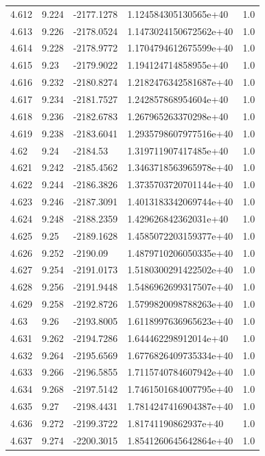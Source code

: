\begin{tabular}{lllll}
4.612 & 9.224 & -2177.1278 & 1.124584305130565e+40 & 1.0 \\
4.613 & 9.226 & -2178.0524 & 1.1473024150672562e+40 & 1.0 \\
4.614 & 9.228 & -2178.9772 & 1.1704794612675599e+40 & 1.0 \\
4.615 & 9.23 & -2179.9022 & 1.194124714858955e+40 & 1.0 \\
4.616 & 9.232 & -2180.8274 & 1.2182476342581687e+40 & 1.0 \\
4.617 & 9.234 & -2181.7527 & 1.242857868954604e+40 & 1.0 \\
4.618 & 9.236 & -2182.6783 & 1.267965263370298e+40 & 1.0 \\
4.619 & 9.238 & -2183.6041 & 1.2935798607977516e+40 & 1.0 \\
4.62 & 9.24 & -2184.53 & 1.319711907417485e+40 & 1.0 \\
4.621 & 9.242 & -2185.4562 & 1.3463718563965978e+40 & 1.0 \\
4.622 & 9.244 & -2186.3826 & 1.3735703720701144e+40 & 1.0 \\
4.623 & 9.246 & -2187.3091 & 1.4013183342069744e+40 & 1.0 \\
4.624 & 9.248 & -2188.2359 & 1.429626842362031e+40 & 1.0 \\
4.625 & 9.25 & -2189.1628 & 1.4585072203159377e+40 & 1.0 \\
4.626 & 9.252 & -2190.09 & 1.4879710206050335e+40 & 1.0 \\
4.627 & 9.254 & -2191.0173 & 1.5180300291422502e+40 & 1.0 \\
4.628 & 9.256 & -2191.9448 & 1.5486962699317507e+40 & 1.0 \\
4.629 & 9.258 & -2192.8726 & 1.5799820098788263e+40 & 1.0 \\
4.63 & 9.26 & -2193.8005 & 1.6118997636965623e+40 & 1.0 \\
4.631 & 9.262 & -2194.7286 & 1.644462298912014e+40 & 1.0 \\
4.632 & 9.264 & -2195.6569 & 1.6776826409735334e+40 & 1.0 \\
4.633 & 9.266 & -2196.5855 & 1.7115740784607942e+40 & 1.0 \\
4.634 & 9.268 & -2197.5142 & 1.7461501684007795e+40 & 1.0 \\
4.635 & 9.27 & -2198.4431 & 1.7814247416904387e+40 & 1.0 \\
4.636 & 9.272 & -2199.3722 & 1.81741190862937e+40 & 1.0 \\
4.637 & 9.274 & -2200.3015 & 1.8541260645642864e+40 & 1.0 \\

\end{tabular}
